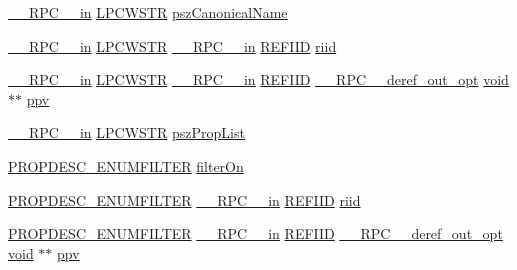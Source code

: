 \begin{DoxyCompactItemize}
\item 
\hyperlink{rpcsal_8h_a20b7f6da600a05c8b541659f14f7f0e6}{\+\_\+\+\_\+\+R\+P\+C\+\_\+\+\_\+in} \hyperlink{mapinls_8h_a25fda90f83ded0efd5456a4e7eda1e0c}{L\+P\+C\+W\+S\+TR} \hyperlink{struct_i_property_system_vtbl_a1e2dda416f6cfff07a88f7bb5e9b48d5}{psz\+Canonical\+Name}
\item 
\hyperlink{rpcsal_8h_a20b7f6da600a05c8b541659f14f7f0e6}{\+\_\+\+\_\+\+R\+P\+C\+\_\+\+\_\+in} \hyperlink{mapinls_8h_a25fda90f83ded0efd5456a4e7eda1e0c}{L\+P\+C\+W\+S\+TR} \hyperlink{rpcsal_8h_a20b7f6da600a05c8b541659f14f7f0e6}{\+\_\+\+\_\+\+R\+P\+C\+\_\+\+\_\+in} \hyperlink{px__win__ds_8c_a80ec49c8ae61e234197d5071d2df497d}{R\+E\+F\+I\+ID} \hyperlink{struct_i_property_system_vtbl_aac0ce3818026e4c98281f171ecc252f8}{riid}
\item 
\hyperlink{rpcsal_8h_a20b7f6da600a05c8b541659f14f7f0e6}{\+\_\+\+\_\+\+R\+P\+C\+\_\+\+\_\+in} \hyperlink{mapinls_8h_a25fda90f83ded0efd5456a4e7eda1e0c}{L\+P\+C\+W\+S\+TR} \hyperlink{rpcsal_8h_a20b7f6da600a05c8b541659f14f7f0e6}{\+\_\+\+\_\+\+R\+P\+C\+\_\+\+\_\+in} \hyperlink{px__win__ds_8c_a80ec49c8ae61e234197d5071d2df497d}{R\+E\+F\+I\+ID} \hyperlink{rpcsal_8h_ab29e89ceb0eb0b075c6f6299b0de6a21}{\+\_\+\+\_\+\+R\+P\+C\+\_\+\+\_\+deref\+\_\+out\+\_\+opt} \hyperlink{sound_8c_ae35f5844602719cf66324f4de2a658b3}{void} $\ast$$\ast$ \hyperlink{struct_i_property_system_vtbl_a529da17ef7eda2ad094c279423f12270}{ppv}
\item 
\hyperlink{rpcsal_8h_a20b7f6da600a05c8b541659f14f7f0e6}{\+\_\+\+\_\+\+R\+P\+C\+\_\+\+\_\+in} \hyperlink{mapinls_8h_a25fda90f83ded0efd5456a4e7eda1e0c}{L\+P\+C\+W\+S\+TR} \hyperlink{struct_i_property_system_vtbl_ac4b7aa1aac2bdf7049252363c2f6a5ea}{psz\+Prop\+List}
\item 
\hyperlink{propsys_8h_ae0217ea4b0b470bbd7c1325f2c164b5d}{P\+R\+O\+P\+D\+E\+S\+C\+\_\+\+E\+N\+U\+M\+F\+I\+L\+T\+ER} \hyperlink{struct_i_property_system_vtbl_a98431896a9a053b89a92b769bdd75f25}{filter\+On}
\item 
\hyperlink{propsys_8h_ae0217ea4b0b470bbd7c1325f2c164b5d}{P\+R\+O\+P\+D\+E\+S\+C\+\_\+\+E\+N\+U\+M\+F\+I\+L\+T\+ER} \hyperlink{rpcsal_8h_a20b7f6da600a05c8b541659f14f7f0e6}{\+\_\+\+\_\+\+R\+P\+C\+\_\+\+\_\+in} \hyperlink{px__win__ds_8c_a80ec49c8ae61e234197d5071d2df497d}{R\+E\+F\+I\+ID} \hyperlink{struct_i_property_system_vtbl_a456c0b46d27e2fb3a7b5f5cfd3a93399}{riid}
\item 
\hyperlink{propsys_8h_ae0217ea4b0b470bbd7c1325f2c164b5d}{P\+R\+O\+P\+D\+E\+S\+C\+\_\+\+E\+N\+U\+M\+F\+I\+L\+T\+ER} \hyperlink{rpcsal_8h_a20b7f6da600a05c8b541659f14f7f0e6}{\+\_\+\+\_\+\+R\+P\+C\+\_\+\+\_\+in} \hyperlink{px__win__ds_8c_a80ec49c8ae61e234197d5071d2df497d}{R\+E\+F\+I\+ID} \hyperlink{rpcsal_8h_ab29e89ceb0eb0b075c6f6299b0de6a21}{\+\_\+\+\_\+\+R\+P\+C\+\_\+\+\_\+deref\+\_\+out\+\_\+opt} \hyperlink{sound_8c_ae35f5844602719cf66324f4de2a658b3}{void} $\ast$$\ast$ \hyperlink{struct_i_property_system_vtbl_a4991051c6b7e532c92d06614f6ad6053}{ppv}

\end{DoxyCompactItemize}
